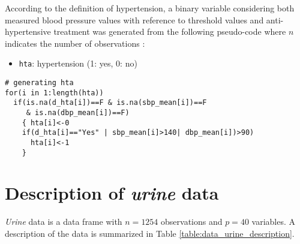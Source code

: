 According to the definition of hypertension, a binary variable considering both measured blood pressure values with reference to threshold values and anti-hypertensive treatment was generated from the following pseudo-code where $n$ indicates the number of observations \cite{kearney_global_2005,kearney_worldwide_2004}:
\begin{itemize}
\item \texttt{hta}: hypertension (1: yes, 0: no)
\end{itemize}

\begin{verbatim}
# generating hta
for(i in 1:length(hta))
  if(is.na(d_hta[i])==F & is.na(sbp_mean[i])==F 
     & is.na(dbp_mean[i])==F)
    { hta[i]<-0
    if(d_hta[i]=="Yes" | sbp_mean[i]>140| dbp_mean[i])>90)
      hta[i]<-1
    }
\end{verbatim}

\section{Description of \emph{urine} data}
\emph{Urine} data is a data frame with $n=1254$ observations and $p=40$ variables. A description of the data is summarized in Table \ref{table:data_urine_description}.


